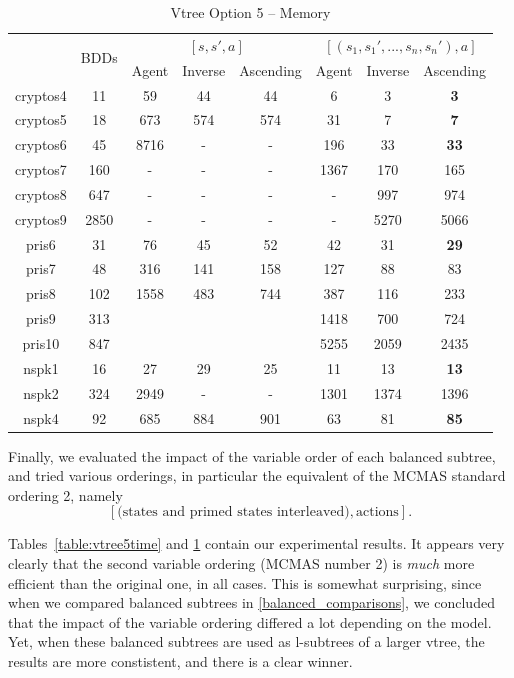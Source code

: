 \documentclass[11pt]{report}
\begin{document}
\begin{table}
\centering
\begin{tabular}{|*{8}{c|}}
\hline
& \multirow{2}{*}{BDDs} & \multicolumn{3}{c|}{$[s, s', a]$}& \multicolumn{3}{c|}{$[(s_1, s_1', ..., s_n, s_n'), a]$}\\ \cline{3-8}
& & Agent & Inverse & Ascending & Agent & Inverse & Ascending\\ \hline
cryptos4 & 11 & 59 & 44 & 44 & 6 & 3 &  \textbf{3}\\ \hline
cryptos5 & 18 & 673 & 574 & 574 &31 & 7 &  \textbf{7}\\ \hline
cryptos6 & 45 & 8716 & 
- & - & 196& 33 &  \textbf{33} \\ \hline
cryptos7 & 160 & - & - & - & 1367 & 170 & 165 \\ \hline
cryptos8 & 647 & - & - & - & - & 997 & 974\\ \hline
cryptos9 & 2850 & - & - & - & - & 5270 & 5066 \\ \hline
pris6 & 31 & 76 & 45 & 52 & 42&31&  \textbf{29}\\ \hline
pris7 & 48 & 316 & 141 & 158 & 127 &88 & 83\\ \hline
pris8 & 102 & 1558 & 483 & 744& 387 & 116 & 233\\ \hline
pris9 & 313 &  &  &  & 1418 & 700 & 724\\ \hline
pris10 & 847 &  &  &  & 5255 & 2059 & 2435\\ \hline
nspk1 & 16 & 27 & 29 & 25  & 11 & 13 &\textbf{13} \\ \hline
nspk2 & 324 & 2949 & - & - & 1301 & 1374 & 1396 \\ \hline
nspk4 & 92 & 685 & 884 & 901& 63&81&  \textbf{85}\\ \hline
\end{tabular}
\caption{Vtree Option 5 -- Memory}
\label{table:vtree5memory}
\end{table}


Finally, we evaluated the impact of the variable order of each balanced subtree, and tried various orderings, in particular the equivalent of the MCMAS standard ordering 2, namely $$[\mbox{(states and primed states interleaved)}, \mbox{actions}].$$

Tables~\ref{table:vtree5time} and \ref{table:vtree5memory} contain our experimental results. It appears very clearly that the second variable ordering (MCMAS number 2) is \textit{much }more efficient than the original one, in all cases. This is somewhat surprising, since when we compared balanced subtrees in \ref{balanced_comparisons}, we concluded that the impact of the variable ordering differed a lot depending on the model. Yet, when these balanced subtrees are used as l-subtrees of a larger vtree, the results are more constistent, and there is a clear winner.
\end{document}
